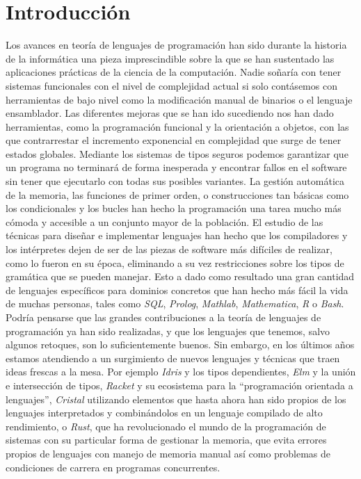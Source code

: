\chapter{Introducción}
Los avances en teoría de lenguajes de programación han sido durante la historia de la informática una pieza imprescindible sobre la que se han sustentado las aplicaciones prácticas de la ciencia de la computación. Nadie soñaría con tener sistemas funcionales con el nivel de complejidad actual si solo contásemos con herramientas de bajo nivel como la modificación manual de binarios o el lenguaje ensamblador. Las diferentes mejoras que se han ido sucediendo nos han dado herramientas, como la programación funcional y la orientación a objetos, con las que contrarrestar el incremento exponencial en complejidad que surge de tener estados globales. Mediante los sistemas de tipos seguros podemos garantizar que un programa no terminará de forma inesperada y encontrar fallos en el software sin tener que ejecutarlo con todas sus posibles variantes. La gestión automática de la memoria, las funciones de primer orden, o construcciones tan básicas como los condicionales y los bucles han hecho la programación una tarea mucho más cómoda y accesible a un conjunto mayor de la población. El estudio de las técnicas para diseñar e implementar lenguajes han hecho que los compiladores y los intérpretes dejen de ser de las piezas de software más difíciles de realizar, como lo fueron en su época, eliminando a su vez restricciones sobre los tipos de gramática que se pueden manejar. Esto a dado como resultado una gran cantidad de lenguajes específicos para dominios concretos que han hecho más fácil la vida de muchas personas, tales como \textit{SQL}, \textit{Prolog}, \textit{Mathlab}, \textit{Mathematica}, \textit{R} o \textit{Bash}.\\

Podría pensarse que las grandes contribuciones a la teoría de lenguajes de programación ya han sido realizadas, y que los lenguajes que tenemos, salvo algunos retoques, son lo suficientemente buenos. Sin embargo, en los últimos años estamos atendiendo a un surgimiento de nuevos lenguajes y técnicas que traen ideas frescas a la mesa. Por ejemplo \textit{Idris} y los tipos dependientes, \textit{Elm} y la unión e intersección de tipos, \textit{Racket} y su ecosistema para la ``programación orientada a lenguajes'', \textit{Cristal} utilizando elementos que hasta ahora han sido propios de los lenguajes interpretados y combinándolos en un lenguaje compilado de alto rendimiento, o \textit{Rust}, que ha revolucionado el mundo de la programación de sistemas con su particular forma de gestionar la memoria, que evita errores propios de lenguajes con manejo de memoria manual así como problemas de condiciones de carrera en programas concurrentes.\\

